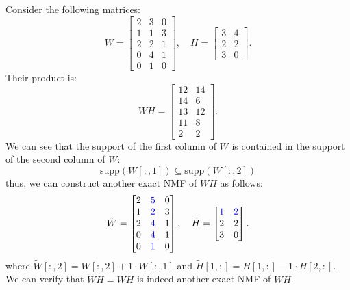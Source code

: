 \begin{example}
Consider the following matrices:
\begin{equation}
    W = \begin{bmatrix}
    2 & 3 & 0 \\
    1 & 1 & 3 \\
    2 & 2 & 1 \\
    0 & 4 & 1 \\
    0 & 1 & 0        
    \end{bmatrix}, \quad
    H = \begin{bmatrix}
    3 & 4  \\
    2 & 2  \\
    3 & 0
    \end{bmatrix}.
\end{equation}
Their product is:
\begin{equation}
    WH = \begin{bmatrix}
    12 & 14 \\
    14 & 6 \\
    13 & 12 \\
    11 & 8 \\
    2 & 2
    \end{bmatrix}.
\end{equation}
We can see that the support of the first column of $W$ is contained in the support of the second column of $W$:
\begin{equation}
    \text{supp}(W[:,1]) \subseteq \text{supp}(W[:,2])
\end{equation}
thus, we can construct another exact NMF of $WH$ as follows:
\begin{equation}    \tilde{W} = \begin{bmatrix}
    2 & \textcolor{blue}{5} & 0 \\
    1 & \textcolor{blue}{2} & 3 \\
    2 & \textcolor{blue}{4} & 1 \\
    0 & \textcolor{blue}{4} & 1 \\
    0 & \textcolor{blue}{1} & 0        
    \end{bmatrix}, \quad
    \tilde{H} = \begin{bmatrix}
    \textcolor{blue}{1} & \textcolor{blue}{2}  \\
    2 & 2  \\
    3 & 0
    \end{bmatrix}.
\end{equation}
where $\tilde{W}[:,2] = W[:,2] + 1 \cdot W[:,1]$ and $\tilde{H}[1,:] = H[1,:] - 1 \cdot H[2,:]$.
We can verify that $\tilde{W} \tilde{H} = WH$ is indeed another exact NMF of $WH$.
\end{example}
